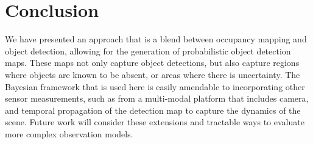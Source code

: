 \section{Conclusion}\label{sec:conclusion}

We have presented an approach that is a blend between occupancy mapping and
object detection, allowing for the generation of probabilistic object detection
maps. These maps not only capture object detections, but also capture regions
where objects are known to be absent, or areas where there is uncertainty. The
Bayesian framework that is used here is easily amendable to incorporating other
sensor measurements, such as from a multi-modal platform that includes camera,
and temporal propagation of the detection map to capture the dynamics of the
scene. Future work will consider these extensions and tractable ways to evaluate
more complex observation models.
